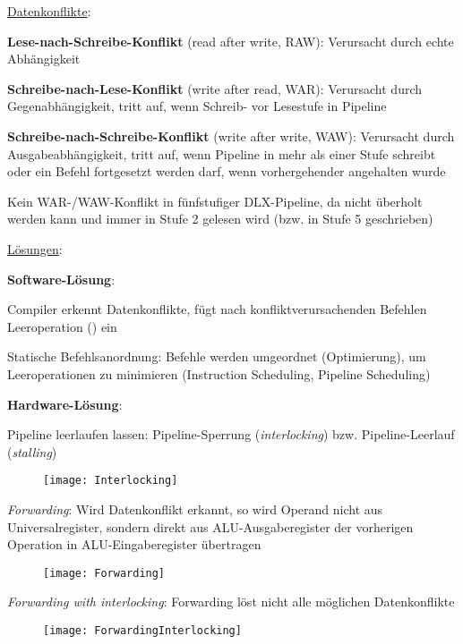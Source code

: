 \begin{items}
  \item \underline{Datenkonflikte}:
  \begin{enumeration}
    \item \textbf{Lese-nach-Schreibe-Konflikt} (read after write, RAW): Verursacht durch echte Abhängigkeit
    \item \textbf{Schreibe-nach-Lese-Konflikt} (write after read, WAR): Verursacht durch Gegenabhängigkeit, tritt auf, wenn Schreib- vor Lesestufe in Pipeline
    \item \textbf{Schreibe-nach-Schreibe-Konflikt} (write after write, WAW): Verursacht durch Ausgabeabhängigkeit, tritt auf, wenn Pipeline in mehr als einer Stufe schreibt oder ein Befehl fortgesetzt werden darf, wenn vorhergehender angehalten wurde
  \end{enumeration}
  \item Kein WAR-/WAW-Konflikt in fünfstufiger DLX-Pipeline, da nicht überholt werden kann und immer in Stufe 2 gelesen wird (bzw. in Stufe 5 geschrieben)
  \item \underline{Lösungen}:
  \begin{enumeration}
    \item \textbf{Software-Lösung}: 
    \begin{enumeration}
      \item Compiler erkennt Datenkonflikte, fügt nach konfliktverursachenden Befehlen Leeroperation () ein
      \item Statische Befehlsanordnung: Befehle werden umgeordnet (Optimierung), um Leeroperationen zu minimieren (Instruction Scheduling, Pipeline Scheduling)
    \end{enumeration}

    \newpage

    \item \textbf{Hardware-Lösung}:
    \begin{enumeration}
      \item Pipeline leerlaufen lassen: Pipeline-Sperrung (\emph{interlocking}) bzw. Pipeline-Leerlauf (\emph{stalling})
      \begin{figure}[H]\centering\label{Interlocking}\texttt{[image: Interlocking]}\end{figure}
      \item \emph{Forwarding}: Wird Datenkonflikt erkannt, so wird Operand nicht aus Universalregister, sondern direkt aus ALU-Ausgaberegister der vorherigen Operation in ALU-Eingaberegister übertragen
      \begin{figure}[H]\centering\label{Forwarding}\texttt{[image: Forwarding]}\end{figure}
      \item \emph{Forwarding with interlocking}: Forwarding löst nicht alle möglichen Datenkonflikte
      \begin{figure}[H]\centering\label{ForwardingInterlocking}\texttt{[image: ForwardingInterlocking]}\end{figure}
    \end{enumeration}
  \end{enumeration}
\end{items}

